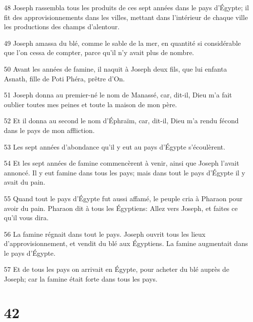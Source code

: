 \par 48 Joseph rassembla tous les produits de ces sept années dans le pays d'Égypte; il fit des approvisionnements dans les villes, mettant dans l'intérieur de chaque ville les productions des champs d'alentour.
\par 49 Joseph amassa du blé, comme le sable de la mer, en quantité si considérable que l'on cessa de compter, parce qu'il n'y avait plus de nombre.
\par 50 Avant les années de famine, il naquit à Joseph deux fils, que lui enfanta Asnath, fille de Poti Phéra, prêtre d'On.
\par 51 Joseph donna au premier-né le nom de Manassé, car, dit-il, Dieu m'a fait oublier toutes mes peines et toute la maison de mon père.
\par 52 Et il donna au second le nom d'Éphraïm, car, dit-il, Dieu m'a rendu fécond dans le pays de mon affliction.
\par 53 Les sept années d'abondance qu'il y eut au pays d'Égypte s'écoulèrent.
\par 54 Et les sept années de famine commencèrent à venir, ainsi que Joseph l'avait annoncé. Il y eut famine dans tous les pays; mais dans tout le pays d'Égypte il y avait du pain.
\par 55 Quand tout le pays d'Égypte fut aussi affamé, le peuple cria à Pharaon pour avoir du pain. Pharaon dit à tous les Égyptiens: Allez vers Joseph, et faites ce qu'il vous dira.
\par 56 La famine régnait dans tout le pays. Joseph ouvrit tous les lieux d'approvisionnement, et vendit du blé aux Égyptiens. La famine augmentait dans le pays d'Égypte.
\par 57 Et de tous les pays on arrivait en Égypte, pour acheter du blé auprès de Joseph; car la famine était forte dans tous les pays.

\chapter{42}

